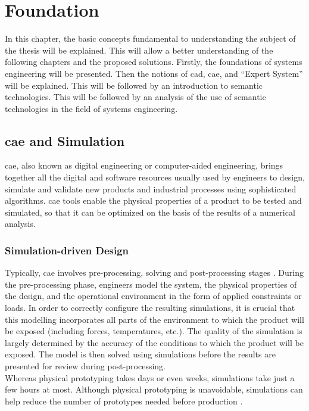 \section{Foundation\label{sec:foundation}}
In this chapter, the basic concepts fundamental to understanding the subject of the thesis will be explained. This will allow a better understanding of the following chapters and the proposed solutions. Firstly, the foundations of systems engineering will be presented. Then the notions of \acrshort{cad}, \acrshort{cae}, and “Expert System” will be explained. This will be followed by an introduction to semantic technologies. This will be followed by an analysis of the use of semantic technologies in the field of systems engineering. 



\subsection{\acrlong{cae} and Simulation}
\acrfull{cae}, also known as digital engineering or computer-aided engineering, brings together all the digital and software resources usually used by engineers to design, simulate and validate new products and industrial processes using sophisticated algorithms. \acrshort{cae} tools enable the physical properties of a product to be tested and simulated, so that it can be optimized on the basis of the results of a numerical analysis.

    \subsubsection{Simulation-driven Design}
    Typically, \acrshort{cae} involves pre-processing, solving and post-processing stages \cite{karlberg2013state}. During the pre-processing phase, engineers model the system, the physical properties of the design, and the operational environment in the form of applied constraints or loads. In order to correctly configure the resulting simulations, it is crucial that this modelling incorporates all parts of the environment to which the product will be exposed (including forces, temperatures, etc.).  The quality of the simulation is largely determined by the accuracy of the conditions to which the product will be exposed. The model is then solved using simulations before the results are presented for review during post-processing. \\

    Whereas physical prototyping takes days or even weeks, simulations take just a few hours at most. Although physical prototyping is unavoidable, simulations can help reduce the number of prototypes needed before production \cite{sellgren1999simulation}.\\
    
